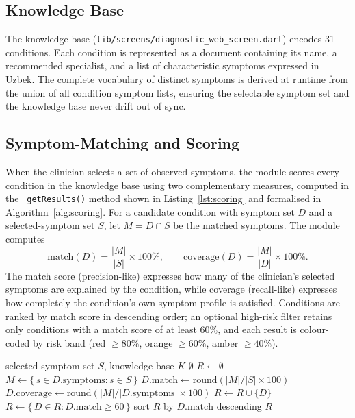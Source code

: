 \documentclass[12pt,a4paper,oneside]{report}
\begin{document}
\subsection{Knowledge Base}

The knowledge base (\texttt{lib/screens/diagnostic\_web\_screen.dart}) encodes
31 conditions. Each condition is represented as a document containing its name,
a recommended specialist, and a list of characteristic symptoms expressed in
Uzbek. The complete vocabulary of distinct symptoms is derived at runtime from
the union of all condition symptom lists, ensuring the selectable symptom set
and the knowledge base never drift out of sync.

\subsection{Symptom-Matching and Scoring}

When the clinician selects a set of observed symptoms, the module scores every
condition in the knowledge base using two complementary measures, computed in
the \texttt{\_getResults()} method shown in Listing~\ref{lst:scoring} and
formalised in Algorithm~\ref{alg:scoring}. For a candidate condition with
symptom set $D$ and a selected-symptom set $S$, let $M = D \cap S$ be the
matched symptoms. The module computes
\begin{equation}
  \mathrm{match}(D) = \frac{|M|}{|S|}\times 100\%,
  \qquad
  \mathrm{coverage}(D) = \frac{|M|}{|D|}\times 100\%.
  \label{eq:scoring}
\end{equation}
The match score (precision-like) expresses how many of the clinician's selected
symptoms are explained by the condition, while coverage (recall-like) expresses
how completely the condition's own symptom profile is satisfied. Conditions are
ranked by match score in descending order; an optional high-risk filter retains
only conditions with a match score of at least 60\%, and each result is
colour-coded by risk band (red $\geq 80\%$, orange $\geq 60\%$,
amber $\geq 40\%$).

\begin{algorithm}[htbp]
  \caption{Symptom-matching and condition scoring}
  \label{alg:scoring}
  \begin{algorithmic}[1]
    \Require selected-symptom set $S$, knowledge base $K$
      \State \Return $\emptyset$
    \EndIf
    \State $R \gets \emptyset$
      \State $M \gets \{\, s \in D.\text{symptoms} : s \in S \,\}$
        \State $D.\text{match} \gets \mathrm{round}(|M|/|S| \times 100)$
        \State $D.\text{coverage} \gets \mathrm{round}(|M|/|D.\text{symptoms}| \times 100)$
        \State $R \gets R \cup \{D\}$
      \EndIf
    \EndFor
      \State $R \gets \{\, D \in R : D.\text{match} \geq 60 \,\}$
    \EndIf
    \State sort $R$ by $D.\text{match}$ descending
    \State \Return $R$
  \end{algorithmic}
\end{algorithm}
\end{document}
